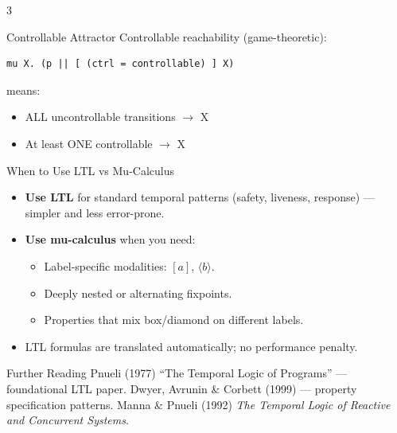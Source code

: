 \begin{multicols}{3}
\begin{tipbox}{Controllable Attractor}
Controllable reachability (game-theoretic):
\begin{lstlisting}[style=ctxdsl]
mu X. (p || [ (ctrl = controllable) ] X)
\end{lstlisting}
 means:
\begin{itemize}
  \item ALL uncontrollable transitions $\rightarrow$ X
  \item At least ONE controllable $\rightarrow$ X
\end{itemize}
\end{tipbox}

\begin{tipbox}{When to Use LTL vs Mu-Calculus}
\begin{itemize}
  \item \textbf{Use LTL} for standard temporal patterns
        (safety, liveness, response) --- simpler and less
        error-prone.
  \item \textbf{Use mu-calculus} when you need:
    \begin{itemize}[leftmargin=*]
      \item Label-specific modalities: $[a]$, $\langle b \rangle$.
      \item Deeply nested or alternating fixpoints.
      \item Properties that mix box/diamond on different
            labels.
    \end{itemize}
  \item LTL formulas are translated automatically; no
        performance penalty.
\end{itemize}
\end{tipbox}

\begin{tipbox}{Further Reading}
Pnueli (1977) ``The Temporal Logic of Programs'' --- foundational LTL paper.
Dwyer, Avrunin \& Corbett (1999) --- property specification patterns.
Manna \& Pnueli (1992) \textit{The Temporal Logic of Reactive and Concurrent Systems}.
\end{tipbox}

\end{multicols}

